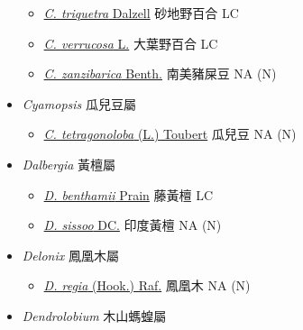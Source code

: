 \begin{itemize}
\begin{itemize}
        \item[] \href{http://www.theplantlist.org/tpl1.1/search?q=Crotalaria+triquetra}{\textit{C. triquetra} Dalzell}   砂地野百合   LC
        \item[] \href{http://www.theplantlist.org/tpl1.1/search?q=Crotalaria+verrucosa}{\textit{C. verrucosa} L.}   大葉野百合   LC
        \item[] \href{http://www.theplantlist.org/tpl1.1/search?q=Crotalaria+zanzibarica}{\textit{C. zanzibarica} Benth.}   南美豬屎豆   NA (N)
  \end{itemize}
 \item[] \textit{Cyamopsis} 瓜兒豆屬
                                
  \begin{itemize}
        \item[] \href{http://www.theplantlist.org/tpl1.1/search?q=Cyamopsis+tetragonoloba}{\textit{C. tetragonoloba} (L.) Toubert}   瓜兒豆   NA (N)
  \end{itemize}
 \item[] \textit{Dalbergia} 黃檀屬
                                
  \begin{itemize}
        \item[] \href{http://www.theplantlist.org/tpl1.1/search?q=Dalbergia+benthamii}{\textit{D. benthamii} Prain}   藤黃檀   LC
        \item[] \href{http://www.theplantlist.org/tpl1.1/search?q=Dalbergia+sissoo}{\textit{D. sissoo} DC.}   印度黃檀   NA (N)
  \end{itemize}
 \item[] \textit{Delonix} 鳳凰木屬
                                
  \begin{itemize}
        \item[] \href{http://www.theplantlist.org/tpl1.1/search?q=Delonix+regia}{\textit{D. regia} (Hook.) Raf.}   鳳凰木   NA (N)
  \end{itemize}
 \item[] \textit{Dendrolobium} 木山螞蝗屬
                                

\end{itemize}
